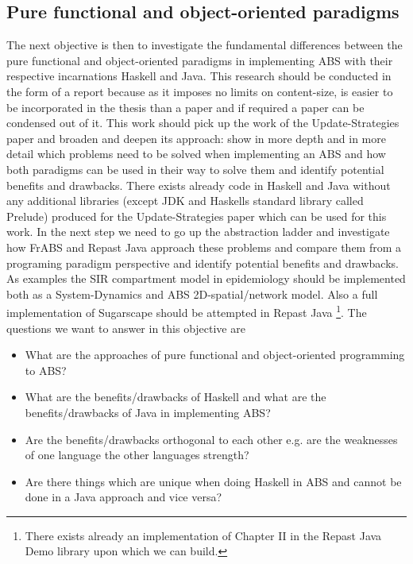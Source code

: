 \subsection{Pure functional and object-oriented paradigms}
The next objective is then to investigate the fundamental differences between the pure functional and object-oriented paradigms in implementing ABS with their respective incarnations Haskell and Java. This research should be conducted in the form of a report because as it imposes no limits on content-size, is easier to be incorporated in the thesis than a paper and if required a paper can be condensed out of it.
This work should pick up the work of the Update-Strategies paper and broaden and deepen its approach: show in more depth and in more detail which problems need to be solved when implementing an ABS and how both paradigms can be used in their way to solve them and identify potential benefits and drawbacks. There exists already code in Haskell and Java without any additional libraries (except JDK and Haskells standard library called Prelude) produced for the Update-Strategies paper which can be used for this work.
In the next step we need to go up the abstraction ladder and investigate how FrABS and Repast Java approach these problems and compare them from a programing paradigm perspective and identify potential benefits and drawbacks.
As examples the SIR compartment model in epidemiology should be implemented both as a System-Dynamics and ABS 2D-spatial/network model. Also a full implementation of Sugarscape should be attempted in Repast Java \footnote{There exists already an implementation of Chapter II in the Repast Java Demo library upon which we can build.}.
The questions we want to answer in this objective are
\begin{itemize}
	\item What are the approaches of pure functional and object-oriented programming to ABS?
	\item What are the benefits/drawbacks of Haskell and what are the benefits/drawbacks of Java in implementing ABS?
	\item Are the benefits/drawbacks orthogonal to each other e.g. are the weaknesses of one language the other languages strength?
	\item Are there things which are unique when doing Haskell in ABS and cannot be done in a Java approach and vice versa?
\end{itemize}

